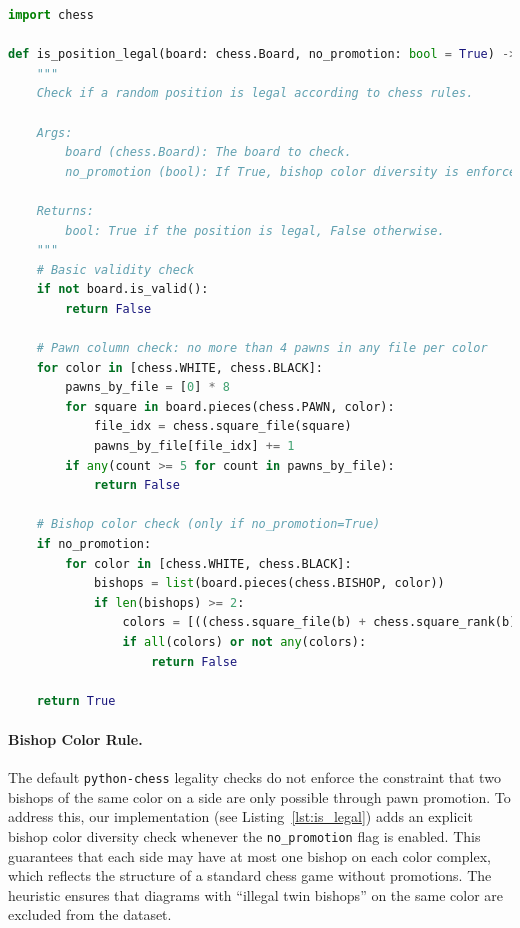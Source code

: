 \documentclass[12pt]{article}
\begin{document}
\begin{lstlisting}[language=Python, caption={Validation of chess positions using python-chess}, label={lst:is_legal}]
import chess

def is_position_legal(board: chess.Board, no_promotion: bool = True) -> bool:
    """
    Check if a random position is legal according to chess rules.

    Args:
        board (chess.Board): The board to check.
        no_promotion (bool): If True, bishop color diversity is enforced.

    Returns:
        bool: True if the position is legal, False otherwise.
    """
    # Basic validity check
    if not board.is_valid():
        return False

    # Pawn column check: no more than 4 pawns in any file per color
    for color in [chess.WHITE, chess.BLACK]:
        pawns_by_file = [0] * 8
        for square in board.pieces(chess.PAWN, color):
            file_idx = chess.square_file(square)
            pawns_by_file[file_idx] += 1
        if any(count >= 5 for count in pawns_by_file):
            return False

    # Bishop color check (only if no_promotion=True)
    if no_promotion:
        for color in [chess.WHITE, chess.BLACK]:
            bishops = list(board.pieces(chess.BISHOP, color))
            if len(bishops) >= 2:
                colors = [((chess.square_file(b) + chess.square_rank(b)) % 2 == 0) for b in bishops]
                if all(colors) or not any(colors):
                    return False

    return True
\end{lstlisting}

\paragraph{Bishop Color Rule.}
The default \texttt{python-chess} legality checks do not enforce the constraint that two bishops of the same color on a side are only possible through pawn promotion. 
To address this, our implementation (see Listing~\ref{lst:is_legal}) adds an explicit bishop color diversity check whenever the \texttt{no\_promotion} flag is enabled. 
This guarantees that each side may have at most one bishop on each color complex, which reflects the structure of a standard chess game without promotions. 
The heuristic ensures that diagrams with ``illegal twin bishops'' on the same color are excluded from the dataset.
\end{document}
